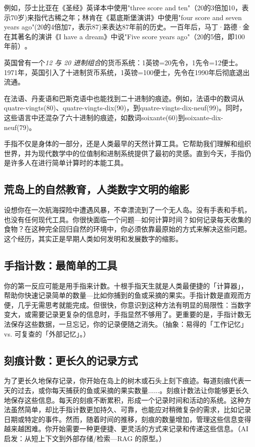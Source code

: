 例如，莎士比亚在《圣经》英译本中使用"three score and ten"（20的3倍加10，表示70岁)来指代古稀之年；林肯在《葛底斯堡演讲》中使用"four score and seven years ago"(20的4倍加7，表示87)来表达87年前的历史。一百年后，马丁·路德·金在其著名的演讲《I have a dream》中说"Five score years ago"​（20的5倍，即100年前）​。

英国曾有一个\emph{12 与 20 进制组合}的货币系统：1英镑=20先令，1先令=12便士。1971年，英国引入了十进制货币系统，1英镑=100便士，先令在1990年后彻底退出流通。

在法语、丹麦语和巴斯克语中也能找到二十进制的痕迹。例如，法语中的数词从quatre-vingts(80)​、quatre-vingts-dix(90)​，到quatre-vingts-dix-neuf(99)。同时，这些语言中还混杂了六十进制的痕迹，如数词soixante(60)到soixante-dix-neuf(79)。

手指不仅是身体的一部分，还是人类最早的天然计算工具。它帮助我们理解和组织世界，并为现代数学中的位值制和进制系统提供了最初的灵感。直到今天，手指仍是许多人在进行简单计算时的本能工具。

\subsection{荒岛上的自然教育，人类数字文明的缩影}

设想你在一次航海探险中遭遇风暴，不幸漂流到了一个无人岛。没有手表和手机，也没有任何现代工具。你很快面临一个问题---如何计算时间？如何记录每天收集的食物？在这种完全回归自然的环境中，你必须依靠最原始的方式来解决这些问题。这个经历，其实正是早期人类如何发明和发展数字的缩影。

\subsection*{手指计数：最简单的工具}

你的第一反应可能是用手指来计数。十根手指天生就是人类最便捷的「计算器」，帮助你快速记录简单的数量---比如你捕到的鱼或采摘的果实。手指计数是直观而方便，几乎无需思考就能完成。但很快，你意识到这种方法有明显的局限性：当数字变大，或需要记录更复杂的信息时，手指显然不够用了。更重要的是，手指计数无法保存这些数据，一旦忘记，你的记录便随之消失。{（抽象：易得的「工作记忆」 vs. 可复查的「外部记忆」。）}

\subsection*{刻痕计数：更长久的记录方式}

为了更长久地保存记录，你开始在岛上的树木或石头上刻下痕迹。每道刻痕代表一天的过去，或你每天捕获的鱼或采摘的果实数量......。刻痕计数法让你能够更长久地保存这些信息。每天的刻痕不断累积，形成一个记录时间和活动的系统。这种方法虽然简单，却比手指计数更加持久、可靠，也能应对稍微复杂的需求，比如记录日期或特定的事件。然而，随着时间的推移，刻痕的数量增加，管理这些信息变得越来越困难。你开始需要一种更便捷、更灵活的方式来记录和传递这些信息。{（AI 启发：从短上下文到外部存储/检索---RAG 的原型。）}

